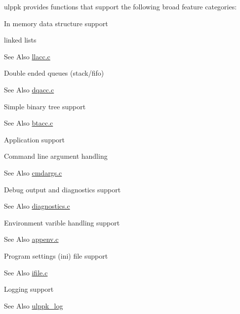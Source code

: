 ulppk provides functions that support the following broad feature categories\-:


\begin{DoxyItemize}
\item In memory data structure support 
\begin{DoxyItemize}
\item linked lists \begin{DoxySeeAlso}{See Also}
\hyperlink{llacc_8c}{llacc.\-c} 
\end{DoxySeeAlso}

\item Double ended queues (stack/fifo) \begin{DoxySeeAlso}{See Also}
\hyperlink{dqacc_8c}{dqacc.\-c} 
\end{DoxySeeAlso}

\item Simple binary tree support \begin{DoxySeeAlso}{See Also}
\hyperlink{btacc_8c}{btacc.\-c} 
\end{DoxySeeAlso}

\end{DoxyItemize}
\item Application support 
\begin{DoxyItemize}
\item Command line argument handling \begin{DoxySeeAlso}{See Also}
\hyperlink{cmdargs_8c}{cmdargs.\-c} 
\end{DoxySeeAlso}

\item Debug output and diagnostics support \begin{DoxySeeAlso}{See Also}
\hyperlink{diagnostics_8c}{diagnostics.\-c} 
\end{DoxySeeAlso}

\item Environment varible handling support \begin{DoxySeeAlso}{See Also}
\hyperlink{appenv_8c}{appenv.\-c} 
\end{DoxySeeAlso}

\item Program settings (ini) file support \begin{DoxySeeAlso}{See Also}
\hyperlink{ifile_8c}{ifile.\-c} 
\end{DoxySeeAlso}

\item Logging support \begin{DoxySeeAlso}{See Also}
\hyperlink{ulppk__log_8h_ab358e7f087f43f579d63f5c45de1d203}{ulppk\-\_\-log} 
\end{DoxySeeAlso}


\end{DoxyItemize}
\end{DoxyItemize}
